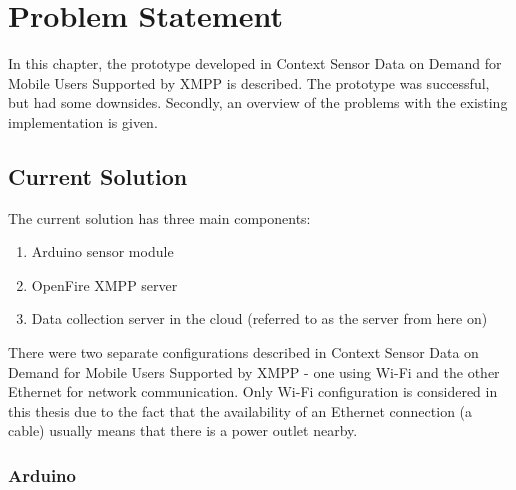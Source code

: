
\chapter{Problem Statement} %


\ifpdf
    \graphicspath{{X/figures/PNG/}{X/figures/PDF/}{X/figures/}}
\else
    \graphicspath{{X/figures/EPS/}{X/figures/}}
\fi


In this chapter, the prototype developed in Context Sensor Data on Demand
for Mobile Users Supported by XMPP \cite{prev_thesis} is described. The prototype was successful, but had some downsides. Secondly, an overview of the problems with the existing implementation is given. 

\section{Current Solution}

The current solution \cite{prev_thesis} has three main components:
\begin{enumerate}
\item Arduino sensor module
\item OpenFire XMPP server
\item Data collection server in the cloud (referred to as the server from here on)
\end{enumerate}

There were two separate configurations described in Context Sensor Data on Demand
for Mobile Users Supported by XMPP - one using Wi-Fi and the other Ethernet for network communication. Only Wi-Fi configuration is considered in this thesis due to the fact that the availability of an Ethernet connection (a cable) usually means that there is a power outlet nearby. 

\subsection{Arduino}

